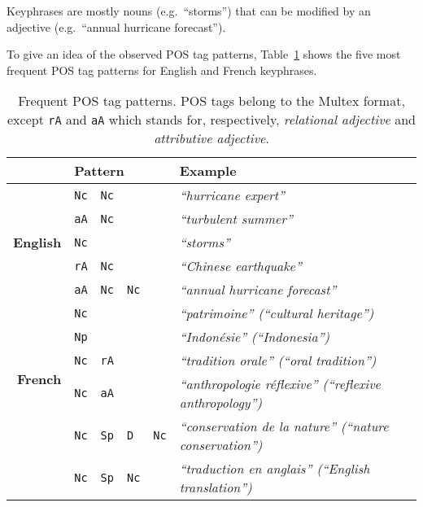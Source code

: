     \begin{property}\label{prop:noun_phrases}
      Keyphrases are mostly nouns (e.g.~``storms'') that can be modified by an
      adjective (e.g.~``annual hurricane forecast'').
    \end{property}

    To give an idea of the observed POS tag patterns,
    Table~\ref{tab:best_patterns} shows the five most frequent POS tag patterns
    for English and French keyphrases.
    \begin{table}[h]
      \centering
      \begin{tabular}{r|lllll}
        \toprule
        \multicolumn{1}{r}{} & \multicolumn{4}{l}{\textbf{Pattern}} & \textbf{Example}\\
        \midrule
        \multirow{5}{*}[-2pt]{\begin{sideways}\textbf{English}\end{sideways}} & \verb:Nc: & \verb:Nc: & & & \textit{``hurricane expert''}\\ %
        & \verb:aA: & \verb:Nc: & & & \textit{``turbulent summer''}\\ %
        & \verb:Nc: & & & & \textit{``storms''}\\ %
        & \verb:rA: & \verb:Nc: & & & \textit{``Chinese earthquake''}\\ %
        & \verb:aA: & \verb:Nc: & \verb:Nc: & & \textit{``annual hurricane forecast''}\\ %
        \hline%
        \multirow{5}{*}[-2pt]{\begin{sideways}\textbf{French}\end{sideways}} & \verb:Nc: & & & & \textit{``patrimoine'' (``cultural heritage'')}\\ %
        & \verb:Np: & & & & \textit{``Indonésie'' (``Indonesia'')}\\ %
        & \verb:Nc: & \verb:rA: & & & \textit{``tradition orale'' (``oral tradition'')}\\ %
        & \verb:Nc: & \verb:aA: & & & \textit{``anthropologie réflexive'' (``reflexive anthropology'')}\\ %
        & \verb:Nc: & \verb:Sp: & \verb:D: & \verb:Nc: & \textit{``conservation de la nature'' (``nature conservation'')}\\ %
        & \verb:Nc: & \verb:Sp: & \verb:Nc: & & \textit{``traduction en anglais'' (``English translation'')}\\ %
        \bottomrule
      \end{tabular}
      \caption{Frequent POS tag patterns. POS tags belong to the Multex format,
               except \texttt{rA} and \texttt{aA} which stands for,
               respectively, \textit{relational adjective} and
               \textit{attributive adjective}.
               \label{tab:best_patterns}}
    \end{table}

